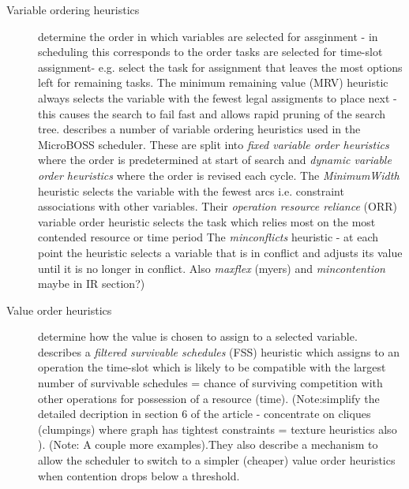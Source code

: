 \begin{description}
\item[Variable ordering heuristics]
determine the order in which variables are selected for assginment - in scheduling this corresponds to the order tasks are selected for time-slot assignment- e.g. select the task for assignment that leaves the most options left for remaining tasks. The minimum remaining value (MRV) heuristic always selects the variable with the fewest legal assigments to place next - this causes the search to fail fast and allows rapid pruning of the search tree. \cite{sadeh91lookahead} describes a number of variable ordering heuristics used in the MicroBOSS scheduler. These are split into \emph{fixed variable order heuristics} where the order is predetermined at start of search and \emph{dynamic variable order heuristics} where the order is revised each cycle. The \emph{MinimumWidth} heuristic selects the variable with the fewest arcs i.e. constraint associations with other variables. Their \emph{operation resource reliance} (ORR) variable order heuristic selects the task which relies most on the most contended resource or time period The \emph{minconflicts} heuristic \cite{minton92minconflicts} - at each point the heuristic selects a variable that is in conflict and adjusts its value until it is no longer in conflict. Also \emph{maxflex} (myers) and \emph{mincontention} maybe in IR section?) 

\item[Value order heuristics]
determine how the value is chosen to assign to a selected variable. \cite{sadeh91lookahead} describes a \emph{filtered survivable schedules} (FSS) heuristic which assigns to an operation the time-slot which is likely to be compatible with the largest number of survivable schedules = chance of surviving competition with other operations for possession of a resource (time). (Note:simplify the detailed decription in section 6 of the article - concentrate on cliques (clumpings) where graph has tightest constraints = texture heuristics also \cite{beck97texturebased} ). (Note: A couple more examples).They also describe a mechanism to allow the scheduler to switch to a simpler (cheaper) value order heuristics when contention drops below a threshold.


\end{description}
